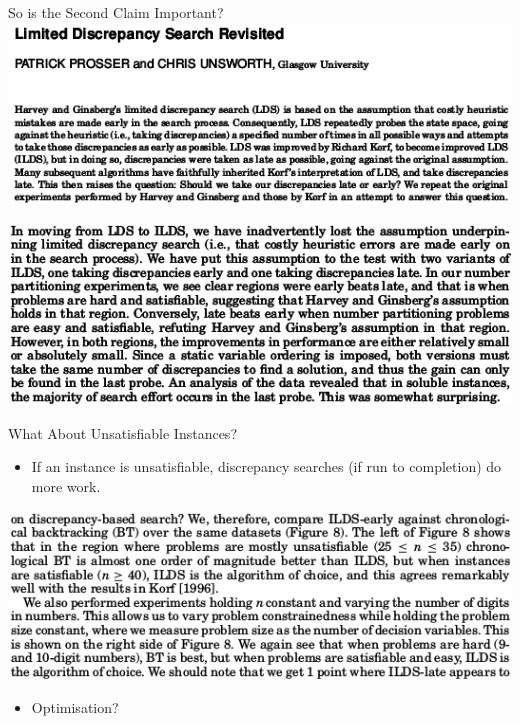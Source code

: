 \documentclass{beamer}
\begin{document}
\begin{frame}{So is the Second Claim Important?}
    \centering\includegraphics*[keepaspectratio=true,scale=0.4]{images/ldsr-paper.png}

    \vspace{2em}

    \centering\includegraphics*[keepaspectratio=true,scale=0.4]{images/ldsr-conclusion.png}

    \vspace{0em}

\end{frame}

\begin{frame}{What About Unsatisfiable Instances?}

    \begin{itemize}
        \item If an instance is unsatisfiable, discrepancy searches (if run to completion) do more
            work.
    \end{itemize}

    \vspace{1em}

    \centering\includegraphics*[keepaspectratio=true,scale=0.4]{images/ldsr-bt.png}

    \vspace{1em}

    \begin{itemize}
        \item Optimisation?
    \end{itemize}

\end{frame}
\end{document}
